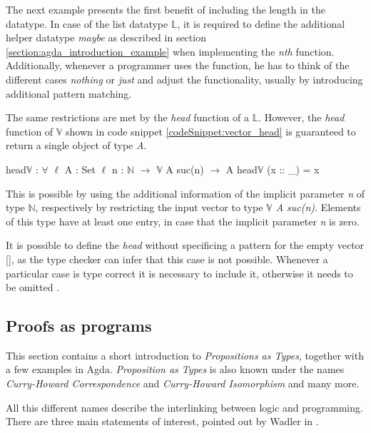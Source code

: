 The next example presents the first benefit of including the length in the datatype.
In case of the list datatype $\mathbb{L}$, it is required to define the additional helper datatype \emph{maybe} as described in section \ref{section:agda_introduction_example} when implementing the \emph{nth} function.
Additionally, whenever a programmer uses the function, he has to think of the different cases \emph{nothing} or \emph{just} and adjust the functionality, usually by introducing additional pattern matching. 

The same restrictions are met by the \emph{head} function of a $\mathbb{L}$. 
However, the \emph{head} function of $\mathbb{V}$ shown in code snippet \ref{codeSnippet:vector_head} is guaranteed to return a single object of type \emph{A}.

\begin{codesnippet}[mathescape=true, caption={Definition of $head\mathbb{V}$ function in Agda}, label={codeSnippet:vector_head}]
head$\mathbb{V}$ : $\forall$ {$\ell$} {A : Set $\ell$} {n : $\mathbb{N}$} $\rightarrow$ 
        $\mathbb{V}$ A suc(n) $\rightarrow$ A
head$\mathbb{V}$ (x :: _) = x
\end{codesnippet}

This is possible by using the additional information of the implicit parameter \emph{n} of type $\mathbb{N}$, respectively by restricting the input vector to type \emph{$\mathbb{V}$ A suc(n)}.
Elements of this type have at least one entry, in case that the implicit parameter \emph{n} is zero.

It is possible to define the \emph{head} without specificing a pattern for the empty vector [], as the type checker can infer that this case is not possible.
Whenever a particular case is type correct it is necessary to include it, otherwise it needs to be omitted \cite{norell:deptyped}.

\subsection{Proofs as programs}\label{section:agda_proofs}
This section contains a short introduction to \emph{Propositions as Types}\cite{10.1145/2699407}, together with a few examples in Agda. 
\emph{Proposition as Types} is also known under the names \emph{Curry-Howard Correspondence}\cite{10.5555/1076265} and \emph{Curry-Howard Isomorphism}\cite{10.1145/2841316} and many more.

All this different names describe the interlinking between logic and programming.
There are three main statements of interest, pointed out by Wadler in \cite{10.1145/2699407}.

